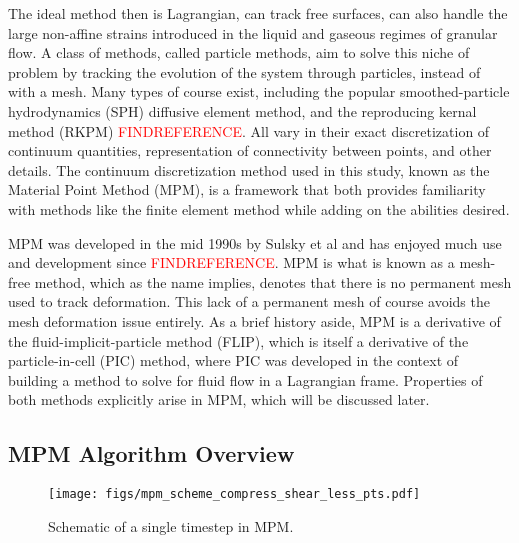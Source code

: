The ideal method then is Lagrangian, can track free surfaces, can also handle the large non-affine strains introduced in the liquid and gaseous regimes of granular flow. A class of methods, called particle methods, aim to solve this niche of problem by tracking the evolution of the system through particles, instead of with a mesh. Many types of course exist, including the popular smoothed-particle hydrodynamics (SPH) diffusive element method, and the reproducing kernal method (RKPM) \textcolor{red}{FINDREFERENCE}. All vary in their exact discretization of continuum quantities, representation of connectivity between points, and other details. The continuum discretization method used in this study, known as the Material Point Method (MPM), is a framework that both provides familiarity with methods like the finite element method while adding on the abilities desired.

MPM was developed in the mid 1990s by Sulsky et al and has enjoyed much use and development since \cite{Sulsky:1994}\textcolor{red}{FINDREFERENCE}. MPM is what is known as a mesh-free method, which as the name implies, denotes that there is no permanent mesh used to track deformation. This lack of a permanent mesh of course avoids the mesh deformation issue entirely. As a brief history aside, MPM is a derivative of the fluid-implicit-particle method (FLIP), which is itself a derivative of the particle-in-cell (PIC) method, where PIC was developed in the context of building a method to solve for fluid flow in a Lagrangian frame. Properties of both methods explicitly arise in MPM, which will be discussed later.

\subsection{MPM Algorithm Overview}

\begin{figure}[htp] 
    \centering
    \texttt{[image: figs/mpm\_scheme\_compress\_shear\_less\_pts.pdf]}
    \caption{Schematic of a single timestep in MPM.}
    \label{MPM_diagram}
\end{figure}

